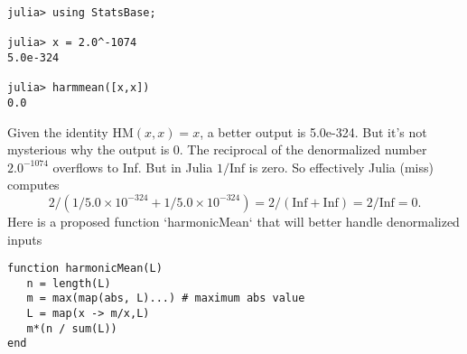 \documentclass[12pt,fleqn]{exam}
\newcommand{\HM}{\mathrm{HM}}
\newcommand{\Inf}{\mathrm{Inf}}
\begin{document}
\begin{verbatim}
julia> using StatsBase;

julia> x = 2.0^-1074
5.0e-324

julia> harmmean([x,x])
0.0
\end{verbatim}
Given the identity $  \HM(x,x) =x$, a better output is 5.0e-324. But it's not mysterious why the output is 0.
The reciprocal of the denormalized number $2.0^{-1074}$ overflows to Inf. But in Julia $1/\Inf$ is zero. So effectively Julia (miss) computes 
\begin{equation} 
  2 / (1/{5.0\times 10^{-324}}  + 1/{5.0\times 10^{-324}}) = 2 /(\Inf + \Inf) = 2/\Inf =0.
 \end{equation}
Here is a proposed function `harmonicMean` that will better handle denormalized inputs
\begin{verbatim}
function harmonicMean(L)
   n = length(L)
   m = max(map(abs, L)...) # maximum abs value
   L = map(x -> m/x,L)  
   m*(n / sum(L))
end
\end{verbatim}
\end{document}

